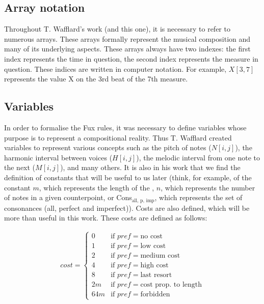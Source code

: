 \subsection{Array notation}
Throughout T. Wafflard's work (and this one), it is necessary to refer to numerous arrays. These arrays formally represent the musical composition and many of its underlying aspects. These arrays always have two indexes: the first index represents the time in question, the second index represents the measure in question. These indices are written in computer notation. For example, $X[3, 7]$ represents the value X on the 3rd beat of the 7th measure.

\subsection{Variables}
In order to formalise the Fux rules, it was necessary to define variables whose purpose is to represent a compositional reality. Thus T. Wafflard created variables to represent various concepts such as the pitch of notes ($N[i,j]$), the harmonic interval between voices ($H[i,j]$), the melodic interval from one note to the next ($M[i,j]$), and many others. It is also in his work that we find the definition of constants that will be useful to us later (think, for example, of the constant $m$, which represents the length of the \cf, $n$, which represents the number of notes in a given counterpoint, or Cons$_{\text{all, p, imp}}$, which represents the set of consonances (all, perfect and imperfect)).
Costs are also defined, which will be more than useful in this work. These costs are defined as follows:

\begin{equation}
    \begin{gathered}
        cost = \begin{cases}
            0 & \text{if } pref = \text{no cost}\\
            1 & \text{if } pref = \text{low cost}\\
            2 & \text{if } pref = \text{medium cost}\\
            4 & \text{if } pref = \text{high cost}\\
            8 & \text{if } pref = \text{last resort}\\
            2m & \text{if } pref = \text{cost prop. to length}\\
            64m & \text{if } pref = \text{forbidden}
        \end{cases}
    \end{gathered}
\end{equation}

